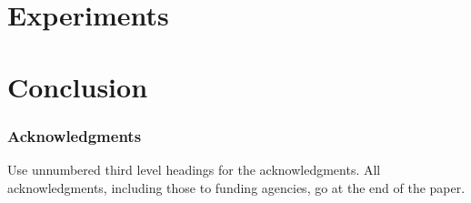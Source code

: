 \documentclass{article} %
\begin{document}
%
\section{Experiments}


%

\section{Conclusion}


\subsubsection*{Acknowledgments}

Use unnumbered third level headings for the acknowledgments. All
acknowledgments, including those to funding agencies, go at the end of the paper.


\end{document}
